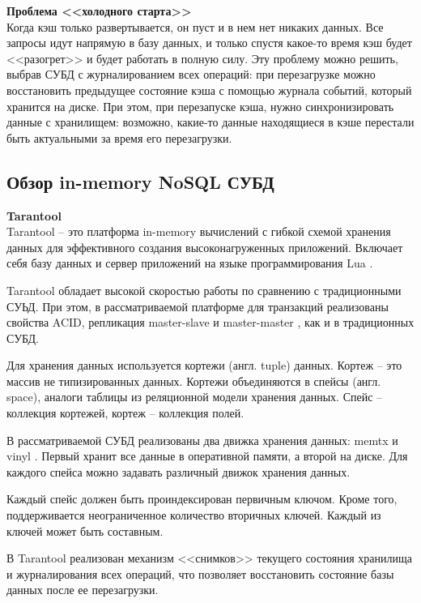 \noindent\textbf{Проблема <<холодного старта>>}\\

Когда кэш только развертывается, он пуст и в нем нет никаких данных. Все запросы идут напрямую в базу данных, и только спустя какое-то время кэш будет <<разогрет>> и будет работать в полную силу. Эту проблему можно решить, выбрав СУБД с журналированием всех операций: при перезагрузке можно восстановить предыдущее состояние кэша с помощью журнала событий, который хранится на диске. При этом, при перезапуске кэша, нужно синхронизировать данные с хранилищем: возможно, какие-то данные находящиеся в кэше перестали быть актуальными за время его перезагрузки.

\subsection{Обзор in-memory NoSQL СУБД}

\noindent\textbf{Tarantool}\\

Tarantool \cite{tarantool} -- это платформа in-memory вычислений с гибкой схемой хранения данных для эффективного создания высоконагруженных приложений. Включает себя базу данных и сервер приложений на языке программирования Lua \cite{lua}.

Tarantool обладает высокой скоростью работы по сравнению с традиционными СУЬД.  При этом, в рассматриваемой платформе для транзакций реализованы свойства ACID, репликация master-slave \cite{master-slave} и master-master \cite{master-master}, как и в традиционных СУБД.

Для хранения данных используется кортежи (англ. tuple) данных. Кортеж -- это массив не типизированных данных. Кортежи объединяются в спейсы (англ. space), аналоги таблицы из реляционной модели хранения данных. Спейс -- коллекция кортежей, кортеж -- коллекция полей.

В рассматриваемой СУБД реализованы два движка хранения данных: memtx \cite{memtx-vinyl} и vinyl \cite{memtx-vinyl}. Первый хранит все данные в оперативной памяти, а второй на диске. Для каждого спейса можно задавать различный движок хранения данных. 

Каждый спейс должен быть проиндексирован первичным ключом. Кроме того, поддерживается неограниченное количество вторичных ключей. Каждый из ключей может быть составным.

В Tarantool реализован механизм <<снимков>> текущего состояния хранилища и журналирования всех операций, что позволяет восстановить состояние базы данных после ее перезагрузки.\\

